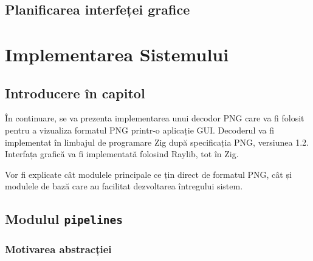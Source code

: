 \documentclass[a4paper,12pt]{report}
\begin{document}
\section{Planificarea interfeței grafice}



\chapter{Implementarea Sistemului}\label{implementation_chapter_title}

\section{Introducere în capitol}

În continuare, se va prezenta implementarea unui decodor \ac{PNG} care va fi folosit pentru
a vizualiza formatul \ac{PNG} printr-o aplicație \ac{GUI}.
Decoderul va fi implementat în limbajul de programare Zig\cite{zig}
după specificația \ac{PNG}, versiunea 1.2\cite{png_spec}.
Interfața grafică va fi implementată folosind Raylib\cite{raylib}, tot în Zig.

Vor fi explicate cât modulele principale ce țin direct de formatul PNG,
cât și modulele de bază care au facilitat dezvoltarea întregului sistem.

\section{Modulul \texttt{pipelines}}

\subsection{Motivarea abstracției}
\end{document}
